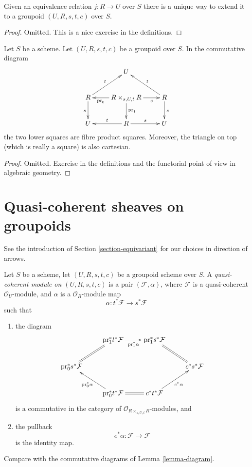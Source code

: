 \begin{lemma}
\label{lemma-equivalence-groupoid}
Given an equivalence relation $j : R \to U$ over $S$
there is a unique way to extend it to a groupoid
$(U, R, s, t, c)$ over $S$.
\end{lemma}

\begin{proof}
Omitted.
This is a nice exercise in the definitions.
\end{proof}

\begin{lemma}
\label{lemma-diagram}
Let $S$ be a scheme.
Let $(U, R, s, t, c)$ be a groupoid over $S$.
In the commutative diagram
$$
\xymatrix{
& U & \\
R \ar[d]_s \ar[ru]^t &
R \times_{s, U, t} R
\ar[l]^-{\text{pr}_0} \ar[d]^{\text{pr}_1} \ar[r]_-c &
R \ar[d]^s \ar[lu]_t \\
U & R \ar[l]_t \ar[r]^s & U
}
$$
the two lower squares are fibre product squares.
Moreover, the triangle on top (which is really a square)
is also cartesian.
\end{lemma}

\begin{proof}
Omitted.
Exercise in the definitions and the functorial point of
view in algebraic geometry.
\end{proof}







\section{Quasi-coherent sheaves on groupoids}
\label{section-groupoids-quasi-coherent}

\noindent
See the introduction of Section \ref{section-equivariant} for our
choices in direction of arrows.

\begin{definition}
\label{definition-groupoid-module}
Let $S$ be a scheme, let $(U, R, s, t, c)$ be a groupoid scheme over $S$.
A {\it quasi-coherent module on $(U, R, s, t, c)$}
is a pair $(\mathcal{F}, \alpha)$, where $\mathcal{F}$ is a quasi-coherent
$\mathcal{O}_U$-module, and $\alpha$ is a $\mathcal{O}_R$-module
map
$$
\alpha : t^*\mathcal{F} \longrightarrow s^*\mathcal{F}
$$
such that
\begin{enumerate}
\item the diagram
$$
\xymatrix{
& \text{pr}_1^*t^*\mathcal{F} \ar[r]_-{\text{pr}_1^*\alpha} &
\text{pr}_1^*s^*\mathcal{F} \ar@{=}[rd] & \\
\text{pr}_0^*s^*\mathcal{F} \ar@{=}[ru] & & & c^*s^*\mathcal{F} \\
& \text{pr}_0^*t^*\mathcal{F} \ar[lu]^{\text{pr}_0^*\alpha} \ar@{=}[r] &
c^*t^*\mathcal{F} \ar[ru]_{c^*\alpha}
}
$$
is a commutative in the category of
$\mathcal{O}_{R \times_{s, U, t} R}$-modules, and
\item the pullback
$$
e^*\alpha : \mathcal{F} \longrightarrow \mathcal{F}
$$
is the identity map.
\end{enumerate}
Compare with the commutative diagrams of Lemma \ref{lemma-diagram}.
\end{definition}

